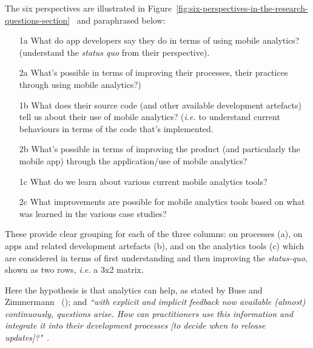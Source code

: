 The six perspectives are illustrated in Figure~\ref{fig:six-perspectives-in-the-research-questions-section}~ and paraphrased below:

\begin{enumerate}
    \item [1a] What do app developers say they do in terms of using mobile analytics? (understand the \emph{status quo} from their perspective).
    \item [2a] What's possible in terms of improving their processes, their practices through using mobile analytics?)
    \item [1b] What does their source code (and other available development artefacts) tell us about their use of mobile analytics? (\emph{i.e.} to understand current behaviours in terms of the code that's implemented.
    \item [2b] What's possible in terms of improving the product (and particularly the mobile app) through the application/use of mobile analytics?
    \item [1c] What do we learn about various current mobile analytics tools?
    \item [2c] What improvements are possible for mobile analytics tools based on what was learned in the various case studies?
\end{enumerate}

These provide clear grouping for each of the three columns: on processes (a), on apps and related development artefacts (b), and on the analytics tools (c) which are considered in terms of first understanding and then improving the \emph{status-quo}, shown as two rows, \emph{i.e.} a 3x2 matrix. 


Here the hypothesis is that analytics can help, as stated by Buse and Zimmermann ~(\citeyear{buse_analytics_2010}); and \emph{``with explicit and implicit feedback now available (almost) continuously, questions arise. How can practitioners use this information and integrate it into their development processes [to decide when to release updates]?"}~.


